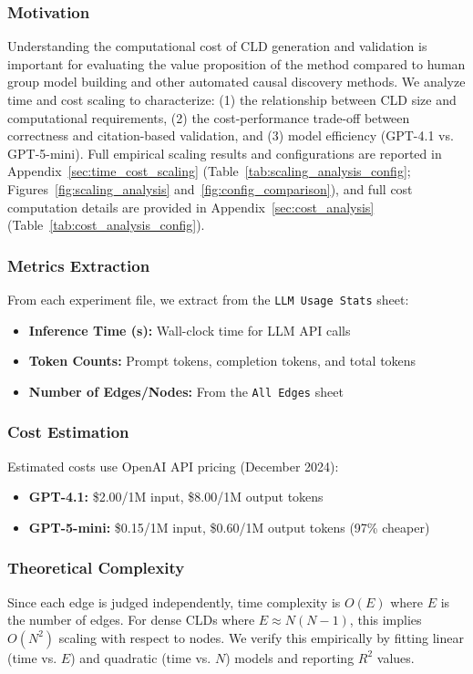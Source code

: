 \subsubsection{Motivation}
Understanding the computational cost of CLD generation and validation is important for evaluating the value proposition of the method compared to human group model building and other automated causal discovery methods. We analyze time and cost scaling to characterize: (1) the relationship between CLD size and computational requirements, (2) the cost-performance trade-off between correctness and citation-based validation, and (3) model efficiency (GPT-4.1 vs. GPT-5-mini).
Full empirical scaling results and configurations are reported in Appendix~\ref{sec:time_cost_scaling} (Table~\ref{tab:scaling_analysis_config}; Figures~\ref{fig:scaling_analysis} and~\ref{fig:config_comparison}), and full cost computation details are provided in Appendix~\ref{sec:cost_analysis} (Table~\ref{tab:cost_analysis_config}).

\subsubsection{Metrics Extraction}
From each experiment file, we extract from the \texttt{LLM Usage Stats} sheet:
\begin{itemize}[noitemsep]
    \item \textbf{Inference Time (s):} Wall-clock time for LLM API calls
    \item \textbf{Token Counts:} Prompt tokens, completion tokens, and total tokens
    \item \textbf{Number of Edges/Nodes:} From the \texttt{All Edges} sheet
\end{itemize}

\subsubsection{Cost Estimation}
Estimated costs use OpenAI API pricing (December 2024):
\begin{itemize}[noitemsep]
    \item \textbf{GPT-4.1:} \$2.00/1M input, \$8.00/1M output tokens
    \item \textbf{GPT-5-mini:} \$0.15/1M input, \$0.60/1M output tokens (97\% cheaper)
\end{itemize}

\subsubsection{Theoretical Complexity}
Since each edge is judged independently, time complexity is $O(E)$ where $E$ is the number of edges. For dense CLDs where $E \approx N(N-1)$, this implies $O(N^2)$ scaling with respect to nodes. We verify this empirically by fitting linear (time vs. $E$) and quadratic (time vs. $N$) models and reporting $R^2$ values.

